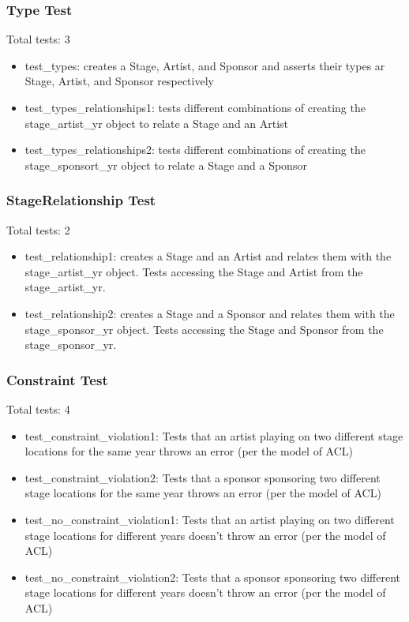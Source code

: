 \documentclass[12pt,english]{scrartcl}
\begin{document}
\subsubsection{Type Test}
Total tests: 3

\begin{itemize}
 \item test\_types: creates a Stage, Artist, and Sponsor and asserts their types ar Stage, Artist, and Sponsor respectively
 \item test\_types\_relationships1: tests different combinations of creating the stage\_artist\_yr object to relate a Stage and an Artist
 \item test\_types\_relationships2: tests different combinations of creating the stage\_sponsort\_yr object to relate a Stage and a Sponsor
\end{itemize}

\subsubsection{StageRelationship Test}
Total tests: 2

\begin{itemize}
 \item test\_relationship1: creates a Stage and an Artist and relates them with the stage\_artist\_yr object. Tests accessing the Stage and Artist from the stage\_artist\_yr.
 \item test\_relationship2: creates a Stage and a Sponsor and relates them with the stage\_sponsor\_yr object. Tests accessing the Stage and Sponsor from the stage\_sponsor\_yr.
\end{itemize}

\subsubsection{Constraint Test}
Total tests: 4
\begin{itemize}
 \item test\_constraint\_violation1: Tests that an artist playing on two different stage locations for the same year throws an error (per the model of ACL)
 \item test\_constraint\_violation2: Tests that a sponsor sponsoring two different stage locations for the same year throws an error (per the model of ACL)
 \item test\_no\_constraint\_violation1: Tests that an artist playing on two different stage locations for different years doesn't throw an error (per the model of ACL)
 \item test\_no\_constraint\_violation2: Tests that a sponsor sponsoring two different stage locations for different years doesn't throw an error (per the model of ACL)
\end{itemize}
\end{document}
